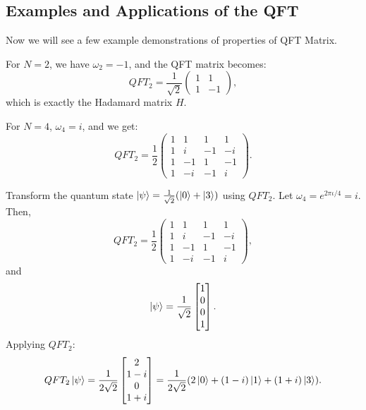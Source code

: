 \subsection{Examples and Applications of the QFT}
Now we will see a few example demonstrations of properties of QFT Matrix.
\begin{example}[QFT for $N=2$ and $N=4$]
For $N = 2$, we have $\omega_2 = -1$, and the QFT matrix becomes:
\[
    QFT_2 = \frac{1}{\sqrt{2}}\begin{pmatrix} 1 & 1 \\ 1 & -1 \end{pmatrix},
\]
which is exactly the Hadamard matrix $H$.

For $N = 4$, $\omega_4 = i$, and we get:
\begin{equation}
    QFT_2 = \frac{1}{2} \begin{pmatrix}
        1 & 1 & 1 & 1 \\
        1 & i & -1 & -i \\
        1 & -1 & 1 & -1 \\
        1 & -i & -1 & i
    \end{pmatrix}.
    \label{eq:qft4_matrix}
\end{equation}
\end{example}
\begin{example}
Transform the quantum state $\ket{\psi} = \frac{1}{\sqrt{2}} (\ket{0} + \ket{3})$ using $QFT_2$.
Let $\omega_4 = e^{2\pi\iota / 4} = i$. Then,
\begin{equation}
    QFT_2 = \frac{1}{2}\begin{pmatrix}
        1 & 1 & 1 & 1 \\
        1 & i & -1 & -i \\
        1 & -1 & 1 & -1 \\
        1 & -i & -1 & i
    \end{pmatrix},
    \label{eq:f4_matrix}
\end{equation}
and
\[
    \ket{\psi} = \frac{1}{\sqrt{2}} \begin{bmatrix} 1 \\ 0 \\ 0 \\ 1 \end{bmatrix}.
\]
Applying $QFT_2$:
\[
    QFT_2 \ket{\psi} = \frac{1}{2\sqrt{2}} \begin{bmatrix} 2 \\ 1 - i \\ 0 \\ 1 + i \end{bmatrix} = \frac{1}{2\sqrt{2}}(2\ket{0} + (1 - i)\ket{1} + (1 + i)\ket{3}).
\]
\end{example}
